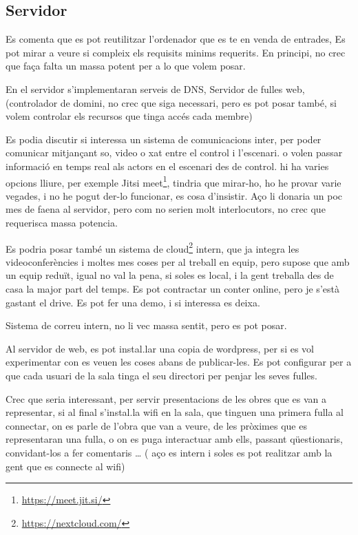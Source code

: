 \documentclass[
  10pt, krantz2,
]{krantz}
\DeclareRobustCommand{\href}[2]{#2\footnote{\url{#1}}}
\renewcommand{\href}[2]{#2\footnote{\url{#1}}}
\begin{document}
\hypertarget{servidor}{%
\subsection{Servidor}\label{servidor}}

Es comenta que es pot reutilitzar l'ordenador que es te en venda de entrades, Es pot mirar a veure si compleix els requisits minims requerits. En principi, no crec que faça falta un massa potent per a lo que volem posar.

En el servidor s'implementaran serveis de DNS, Servidor de fulles web, (controlador de domini, no crec que siga necessari, pero es pot posar també, si volem controlar els recursos que tinga accés cada membre)

Es podia discutir si interessa un sistema de comunicacions inter, per poder comunicar mitjançant so, video o xat entre el control i l'escenari. o volen passar informació en temps real als actors en el escenari des de control. hi ha varies opcions lliure, per exemple \href{https://meet.jit.si/}{Jitsi meet}, tindria que mirar-ho, ho he provar varie vegades, i no he pogut der-lo funcionar, es cosa d'insistir. Aço li donaria un poc mes de faena al servidor, pero com no serien molt interlocutors, no crec que requerisca massa potencia.

Es podria posar també un sistema de \href{https://nextcloud.com/}{cloud} intern, que ja integra les videoconferències i moltes mes coses per al treball en equip, pero supose que amb un equip reduït, igual no val la pena, si soles es local, i la gent treballa des de casa la major part del temps. Es pot contractar un conter online, pero je s'està gastant el drive. Es pot fer una demo, i si interessa es deixa.

Sistema de correu intern, no li vec massa sentit, pero es pot posar.

Al servidor de web, es pot instal.lar una copia de wordpress, per si es vol experimentar con es veuen les coses abans de publicar-les. Es pot configurar per a que cada usuari de la sala tinga el seu directori per penjar les seves fulles.

Crec que seria interessant, per servir presentacions de les obres que es van a representar, si al final s'instal.la wifi en la sala, que tinguen una primera fulla al connectar, on es parle de l'obra que van a veure, de les pròximes que es representaran una fulla, o on es puga interactuar amb ells, passant qüestionaris, convidant-los a fer comentaris \ldots{} ( aço es intern i soles es pot realitzar amb la gent que es connecte al wifi)
\end{document}
